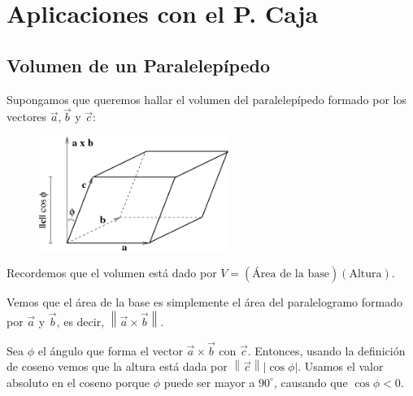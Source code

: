 \documentclass[12pt, fleqn]{report}                             %
\theoremstyle{break}                                            %
\newcommand{\Wrap}[1]{\left( #1 \right)}                        %
\newcommand{\abs}[1]{\left\lvert #1 \right\lvert}               %
\newcommand{\Abs}[1]{\left\lVert #1 \right\lVert}               %
\begin{document}
        \clearpage
        \section{Aplicaciones con el P. Caja}
        
            \subsection{Volumen de un Paralelepípedo}
        
                Supongamos que queremos hallar el volumen del paralelepípedo formado por los
                vectores $\vec{a}, \vec{b}$ y $\vec{c}$:
            
                \begin{figure}[H]
                    \centering
                    \includegraphics[width=0.55\textwidth]{parallelepiped}
                \end{figure}
            
                Recordemos que el volumen está dado por $V = \Wrap{\text{Área de la base}}\Wrap{\text{Altura}}$.
                
                Vemos que el área de la base es simplemente el área del paralelogramo formado por $\vec{a}$ y
                $\vec{b}$, es decir, $\Abs{\vec{a} \times \vec{b}}$.
                
                Sea $\phi$ el ángulo que forma el vector $\vec{a} \times \vec{b}$ con $\vec{c}$.
                Entonces, usando la definición de coseno vemos que la altura está dada por
                $\Abs{\vec{c}} \abs{\cos \phi}$. Usamos el valor absoluto en el coseno porque
                $\phi$ puede ser mayor a $90^\circ$, causando que $\cos \phi < 0$.
                
\end{document}
